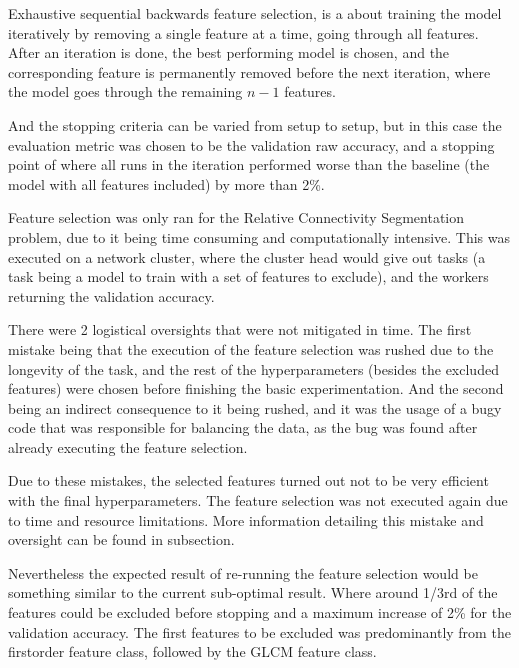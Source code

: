 Exhaustive sequential backwards feature selection, is a about training the model iteratively by removing a single feature at a time, going through all features. After an iteration is done, the best performing model is chosen, and the corresponding feature is permanently removed before the next iteration, where the model goes through the remaining $n-1$ features.\par
And the stopping criteria can be varied from setup to setup, but in this case the evaluation metric was chosen to be the validation raw accuracy, and a stopping point of where all runs in the iteration performed worse than the baseline (the model with all features included) by more than 2\%.\par
Feature selection was only ran for the Relative Connectivity Segmentation problem, due to it being time consuming and computationally intensive. This was executed on a network cluster, where the cluster head would give out tasks (a task being a model to train with a set of features to exclude), and the workers returning the validation accuracy.\par
There were 2 logistical oversights that were not mitigated in time. The first mistake being that the execution of the feature selection was rushed due to the longevity of the task, and the rest of the hyperparameters (besides the excluded features) were chosen before finishing the basic experimentation. And the second being an indirect consequence to it being rushed, and it was the usage of a bugy code that was responsible for balancing the data, as the bug was found after already executing the feature selection.\par
Due to these mistakes, the selected features turned out not to be very efficient with the final hyperparameters. The feature selection was not executed again due to time and resource limitations. More information detailing this mistake and oversight can be found in  subsection.\par
Nevertheless the expected result of re-running the feature selection would be something similar to the current sub-optimal result. Where around 1/3rd of the features could be excluded before stopping and a maximum increase of 2\% for the validation accuracy. The first features to be excluded was predominantly from the firstorder feature class, followed by the \ac{GLCM} feature class.

